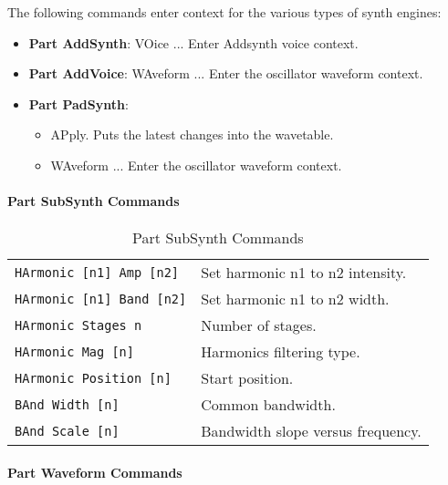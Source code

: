    The following commands enter context for the various types of
   synth engines:

   \begin{itemize}
      \item \textbf{Part AddSynth}:
        VOice ... Enter Addsynth voice context.
      \item \textbf{Part AddVoice}:
        WAveform ... Enter the oscillator waveform context.
      \item \textbf{Part PadSynth}:
      \begin{itemize}
         \item APply. Puts the latest changes into the wavetable.
         \item WAveform ... Enter the oscillator waveform context.
      \end{itemize}
   \end{itemize}

\paragraph{Part SubSynth Commands}
\label{paragraph:command_line_part_subsynth_commands}

   \begin{table}[H]
      \centering
      \caption{Part SubSynth Commands}
      \label{table:yoshimi_part_subsynth_commands}
      \begin{tabular}{l l}

\texttt{HArmonic [n1] Amp [n2]} &
   Set harmonic n1 to n2 intensity. \\
\texttt{HArmonic [n1] Band [n2]} &
   Set harmonic n1 to n2 width. \\
\texttt{HArmonic Stages n} &
   Number of stages. \\
\texttt{HArmonic Mag [n]} &
   Harmonics filtering type. \\
\texttt{HArmonic Position [n]} &
   Start position. \\
\texttt{BAnd Width [n]} &
   Common bandwidth. \\
\texttt{BAnd Scale [n]} &
   Bandwidth slope versus frequency. \\

      \end{tabular}
   \end{table}

\paragraph{Part Waveform Commands}
\label{paragraph:command_line_part_waveform_commands}

